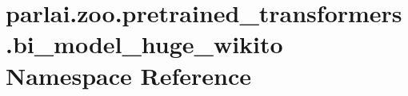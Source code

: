 \hypertarget{namespaceparlai_1_1zoo_1_1pretrained__transformers_1_1bi__model__huge__wikito}{}\section{parlai.\+zoo.\+pretrained\+\_\+transformers.\+bi\+\_\+model\+\_\+huge\+\_\+wikito Namespace Reference}
\label{namespaceparlai_1_1zoo_1_1pretrained__transformers_1_1bi__model__huge__wikito}
